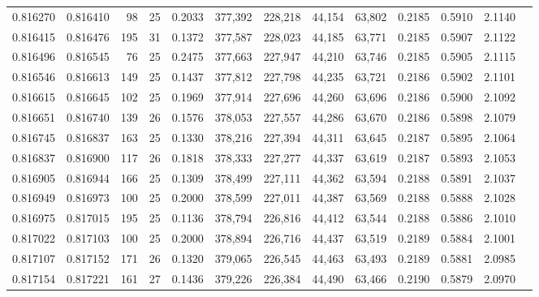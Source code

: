 \begin{tabular}{rrrrrrrrrrrrr}
0.816270 & 0.816410 &    98 &  25 &                                     0.2033 & 377,392 & 228,218 &  44,154 &  63,802 & 0.2185 & 0.5910 & 2.1140 \\
0.816415 & 0.816476 &   195 &  31 &                                     0.1372 & 377,587 & 228,023 &  44,185 &  63,771 & 0.2185 & 0.5907 & 2.1122 \\
0.816496 & 0.816545 &    76 &  25 &                                     0.2475 & 377,663 & 227,947 &  44,210 &  63,746 & 0.2185 & 0.5905 & 2.1115 \\
0.816546 & 0.816613 &   149 &  25 &                                     0.1437 & 377,812 & 227,798 &  44,235 &  63,721 & 0.2186 & 0.5902 & 2.1101 \\
0.816615 & 0.816645 &   102 &  25 &                                     0.1969 & 377,914 & 227,696 &  44,260 &  63,696 & 0.2186 & 0.5900 & 2.1092 \\
0.816651 & 0.816740 &   139 &  26 &                                     0.1576 & 378,053 & 227,557 &  44,286 &  63,670 & 0.2186 & 0.5898 & 2.1079 \\
0.816745 & 0.816837 &   163 &  25 &                                     0.1330 & 378,216 & 227,394 &  44,311 &  63,645 & 0.2187 & 0.5895 & 2.1064 \\
0.816837 & 0.816900 &   117 &  26 &                                     0.1818 & 378,333 & 227,277 &  44,337 &  63,619 & 0.2187 & 0.5893 & 2.1053 \\
0.816905 & 0.816944 &   166 &  25 &                                     0.1309 & 378,499 & 227,111 &  44,362 &  63,594 & 0.2188 & 0.5891 & 2.1037 \\
0.816949 & 0.816973 &   100 &  25 &                                     0.2000 & 378,599 & 227,011 &  44,387 &  63,569 & 0.2188 & 0.5888 & 2.1028 \\
0.816975 & 0.817015 &   195 &  25 &                                     0.1136 & 378,794 & 226,816 &  44,412 &  63,544 & 0.2188 & 0.5886 & 2.1010 \\
0.817022 & 0.817103 &   100 &  25 &                                     0.2000 & 378,894 & 226,716 &  44,437 &  63,519 & 0.2189 & 0.5884 & 2.1001 \\
0.817107 & 0.817152 &   171 &  26 &                                     0.1320 & 379,065 & 226,545 &  44,463 &  63,493 & 0.2189 & 0.5881 & 2.0985 \\
0.817154 & 0.817221 &   161 &  27 &                                     0.1436 & 379,226 & 226,384 &  44,490 &  63,466 & 0.2190 & 0.5879 & 2.0970 \\

\end{tabular}
